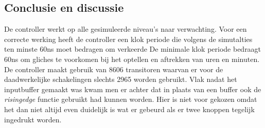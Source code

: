 \subsection{Conclusie en discussie}
De controller werkt op alle gesimuleerde niveau's naar verwachting. Voor een correcte werking heeft de controller een klok periode die volgens de simutalties ten minste 60ns moet bedragen om verkeerde 
De minimale klok periode bedraagt 60ns om gliches te voorkomen bij het optellen en aftrekken van uren en minuten. 
De controller maakt gebruik van 8606 transitoren waarvan er voor de daadwerkelijke schakelingen slechts 2965 worden gebruikt. Vlak nadat het inputbuffer gemaakt was kwam men er achter dat in plaats van een buffer ook de \emph{rising\textunderscore edge} functie gebruikt had kunnen worden. Hier is niet voor gekozen omdat het dan niet altijd even duidelijk is wat er gebeurd als er twee knoppen tegelijk ingedrukt worden.

